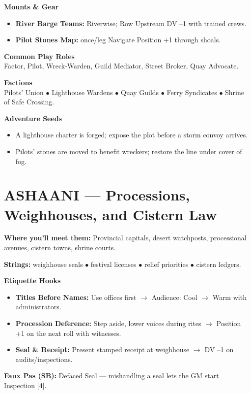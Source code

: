 \documentclass[11pt]{article}
\begin{document}
\textbf{Mounts \& Gear}
\begin{itemize}
\item \textbf{River Barge Teams:} Riverwise; Row Upstream DV --1 with trained crews.
\item \textbf{Pilot Stones Map:} once/leg Navigate Position +1 through shoals.
\end{itemize}

\textbf{Common Play Roles}\\
Factor, Pilot, Wreck-Warden, Guild Mediator, Street Broker, Quay Advocate.

\textbf{Factions}\\
Pilots' Union $\bullet$ Lighthouse Wardens $\bullet$ Quay Guilds $\bullet$ Ferry Syndicates $\bullet$ Shrine of Safe Crossing.

\textbf{Adventure Seeds}
\begin{itemize}
\item A lighthouse charter is forged; expose the plot before a storm convoy arrives.
\item Pilots' stones are moved to benefit wreckers; restore the line under cover of fog.
\end{itemize}

\section*{ASHAANI --- Processions, Weighhouses, and Cistern Law}

\textbf{Where you'll meet them:} Provincial capitals, desert watchposts, processional avenues, cistern towns, shrine courts.

\textbf{Strings:} weighhouse seals $\bullet$ festival licenses $\bullet$ relief priorities $\bullet$ cistern ledgers.

\textbf{Etiquette Hooks}
\begin{itemize}
\item \textbf{Titles Before Names:} Use offices first $\rightarrow$ Audience: Cool $\rightarrow$ Warm with administrators.
\item \textbf{Procession Deference:} Step aside, lower voices during rites $\rightarrow$ Position +1 on the next roll with witnesses.
\item \textbf{Seal \& Receipt:} Present stamped receipt at weighhouse $\rightarrow$ DV --1 on audits/inspections.
\end{itemize}

\textbf{Faux Pas (SB):} Defaced Seal --- mishandling a seal lets the GM start Inspection [4].
\end{document}
